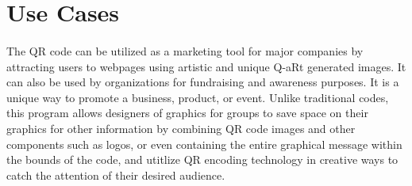 \documentclass{article}
\begin{document}
\section{Use Cases}

	\paragraph{}
	
		The QR code can be utilized as a marketing tool for major companies by 
		attracting users to webpages using artistic and unique Q-aRt generated 
		images. It can also be used by organizations for fundraising and 
		awareness purposes. It is a unique way to promote a business, product, 
		or event. Unlike traditional codes, this program allows designers of
		graphics for groups to save space on their graphics for other information 
		by combining QR code images and other components such as logos, or even 
		containing the entire graphical message within the bounds of the code,
		and utitlize QR encoding technology in creative ways to catch the attention
		of their desired audience.
\end{document}
